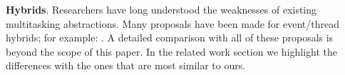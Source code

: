 \documentclass[9pt,preprint]{sigplanconf}
\begin{document}
\textbf{Hybrids}.
Researchers have long understood the weaknesses of existing multitasking abstractions.
Many proposals have been made for event/thread hybrids; for example: \cite{Boudol2007, Boussinot2006, Cunningham2005, Dabrowski2006, Fischer2007, Kerneis2014, Krohn2007, Li2007, Behren2003}.
A detailed comparison with all of these proposals is beyond the scope of this paper.
In the related work section we highlight the differences with the ones that are most similar to ours.





\end{document}
